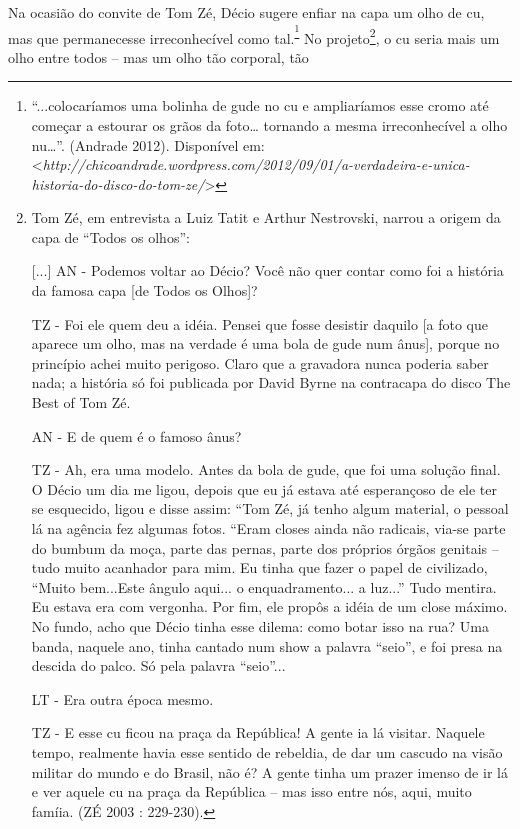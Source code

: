Na ocasião do convite de Tom Zé, Décio sugere enfiar na capa um olho de
cu, mas que permanecesse irreconhecível como
tal.\textsuperscript{\footnote{``...colocaríamos uma bolinha de gude no
  cu e ampliaríamos esse cromo até começar a estourar os grãos da
  foto\ldots{} tornando a mesma irreconhecível a olho nu\ldots{}''.
  (Andrade 2012). Disponível em:
  \textless{}{\emph{http://chicoandrade.wordpress.com/2012/09/01/a-verdadeira-e-unica-historia-do-disco-do-tom-ze/}}\textgreater{}}}
No projeto\footnote{Tom Zé, em entrevista a Luiz Tatit
  e Arthur Nestrovski, narrou a origem da capa de ``Todos os olhos'':

  {[}...{]} AN - Podemos voltar ao Décio? Você não quer contar como foi
  a história da famosa capa {[}de Todos os Olhos{]}?

  TZ - Foi ele quem deu a idéia. Pensei que fosse desistir daquilo {[}a
  foto que aparece um olho, mas na verdade é uma bola de gude num
  ânus{]}, porque no princípio achei muito perigoso. Claro que a
  gravadora nunca poderia saber nada; a história só foi publicada por
  David Byrne na contracapa do disco The Best of Tom Zé.

  AN - E de quem é o famoso ânus?

  TZ - Ah, era uma modelo. Antes da bola de gude, que foi uma solução
  final. O Décio um dia me ligou, depois que eu já estava até
  esperançoso de ele ter se esquecido, ligou e disse assim: ``Tom Zé, já
  tenho algum material, o pessoal lá na agência fez algumas fotos.
  ``Eram closes ainda não radicais, via-se parte do bumbum da moça,
  parte das pernas, parte dos próprios órgãos genitais -- tudo muito
  acanhador para mim. Eu tinha que fazer o papel de civilizado, ``Muito
  bem...Este ângulo aqui... o enquadramento... a luz...'' Tudo mentira.
  Eu estava era com vergonha. Por fim, ele propôs a idéia de um close
  máximo. No fundo, acho que Décio tinha esse dilema: como botar isso na
  rua? Uma banda, naquele ano, tinha cantado num show a palavra
  ``seio'', e foi presa na descida do palco. Só pela palavra ``seio''...

  LT - Era outra época mesmo.

  TZ - E esse cu ficou na praça da República! A gente ia lá visitar.
  Naquele tempo, realmente havia esse sentido de rebeldia, de dar um
  cascudo na visão militar do mundo e do Brasil, não é? A gente tinha um
  prazer imenso de ir lá e ver aquele cu na praça da República -- mas
  isso entre nós, aqui, muito famíia. (ZÉ 2003 : 229-230).}, o cu
seria mais um olho entre todos -- mas um olho tão corporal, tão
